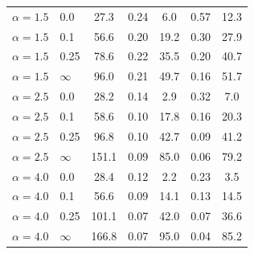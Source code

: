 \begin{table}[h]
\begin{tabular}{llccccc}
$\alpha=1.5$ & 0.0 & 27.3 & 0.24 & 6.0 & 0.57 & 12.3 \\
$\alpha=1.5$ & 0.1 & 56.6 & 0.20 & 19.2 & 0.30 & 27.9 \\
$\alpha=1.5$ & 0.25 & 78.6 & 0.22 & 35.5 & 0.20 & 40.7 \\
$\alpha=1.5$ & $\infty$ & 96.0 & 0.21 & 49.7 & 0.16 & 51.7 \\
$\alpha=2.5$ & 0.0 & 28.2 & 0.14 & 2.9 & 0.32 & 7.0 \\
$\alpha=2.5$ & 0.1 & 58.6 & 0.10 & 17.8 & 0.16 & 20.3 \\
$\alpha=2.5$ & 0.25 & 96.8 & 0.10 & 42.7 & 0.09 & 41.2 \\
$\alpha=2.5$ & $\infty$ & 151.1 & 0.09 & 85.0 & 0.06 & 79.2 \\
$\alpha=4.0$ & 0.0 & 28.4 & 0.12 & 2.2 & 0.23 & 3.5 \\
$\alpha=4.0$ & 0.1 & 56.6 & 0.09 & 14.1 & 0.13 & 14.5 \\
$\alpha=4.0$ & 0.25 & 101.1 & 0.07 & 42.0 & 0.07 & 36.6 \\
$\alpha=4.0$ & $\infty$ & 166.8 & 0.07 & 95.0 & 0.04 & 85.2 \\
\bottomrule
\end{tabular}
\end{table}
